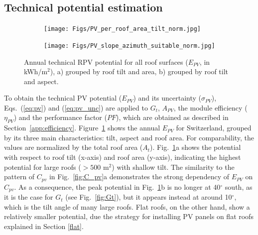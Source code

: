 
\subsection{Technical potential estimation}
\label{solar_tech}

\begin{figure}[tb]
\centering
\begin{subfigure}{.48\textwidth}
  \centering
  \texttt{[image: Figs/PV\_per\_roof\_area\_tilt\_norm.jpg]} 
  \subcaption{}
\end{subfigure}
\begin{subfigure}{.48\textwidth}
  \centering
  \texttt{[image: Figs/PV\_slope\_azimuth\_suitable\_norm.jpg]}
  \subcaption{}
\end{subfigure}
\caption{Annual technical RPV potential for all roof surfaces ($E_{PV}$, in kWh/m$^2$), a) grouped by roof tilt and area, b) grouped by roof tilt and aspect.}
\label{fig:pv_roof}
\end{figure}

To obtain the technical PV potential ($E_{PV}$) and its uncertainty ($\sigma_{PV}$), Eqs.~(\ref{eq:pv}) and (\ref{eq:pv_unc}) are applied to $G_t$, $A_{PV}$, the module efficiency ($\eta_{PV}$) and the performance factor ($\mathit{PF}$), which are obtained as described in Section~\ref{app:efficiency}.
%
Figure~\ref{fig:pv_roof} shows the annual $E_{PV}$ for Switzerland, grouped by its three main characteristics: tilt, aspect and roof area. For comparability, the values are normalized by the total roof area ($A_t$). 
Fig.~\ref{fig:pv_roof}a shows the potential with respect to roof tilt (x-axis) and roof area (y-axis), indicating the highest potential for large roofs ($> 500$ m$^2$) with shallow tilt. 
The similarity to the pattern of $C_{\mathit{pv}}$ in Fig.~\ref{fig:C_pv}a demonstrates the strong dependency of $E_{PV}$ on $C_{\mathit{pv}}$.
As a consequence, the peak potential in Fig.~\ref{fig:pv_roof}b is no longer at 40$^\circ$ south, as it is the case for $G_t$ (see Fig.~\ref{fig:Gt}), but it appears instead at around 10$^\circ$, which is the tilt angle of many large roofs. 
Flat roofs, on the other hand, show a relatively smaller potential, due the strategy for installing PV panels on flat roofs explained in Section \ref{flat}.

